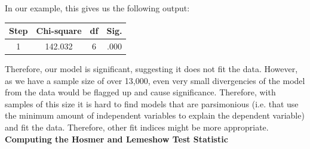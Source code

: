 \documentclass[a4paper,12pt]{article}
\begin{document}
In our example, this gives us the following output:

\begin{center}
	\begin{tabular}{|c|c|c|c|}
		\hline  Step	& Chi-square&	df 	 & Sig. \\ \hline
		1	 & 142.032	& 6	 &.000 \\ 
		\hline 
	\end{tabular} 
\end{center}


Therefore, our model is significant, suggesting it does not fit the data. However, as we have a sample size of over 13,000, even very small divergencies of the model from the data would be flagged up and cause significance. Therefore, with samples of this size it is hard to find models that are parsimonious (i.e. that use the minimum amount of independent variables to explain the dependent variable) and fit the data. Therefore, other fit indices might be more appropriate.\\


\noindent \textbf{Computing the Hosmer and Lemeshow Test Statistic}
\end{document}
